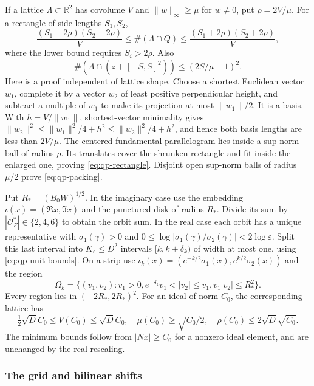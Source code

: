 If a lattice $\Lambda\subset\mathbb R^2$ has covolume $V$ and
$\|w\|_\infty\geq\mu$ for $w\ne0$, put $\rho=2V/\mu$.
For a rectangle of side lengths $S_1,S_2$,
\begin{equation}
 \frac{(S_1-2\rho)(S_2-2\rho)}V
 \leq\#(\Lambda\cap Q)
 \leq\frac{(S_1+2\rho)(S_2+2\rho)}V,
 \label{eq:qp-rectangle}
\end{equation}
where the lower bound requires $S_i>2\rho$.
Also
\begin{equation}
 \#(\Lambda\cap(z+[-S,S]^2))\leq(2S/\mu+1)^2.
 \label{eq:qp-packing}
\end{equation}
Here is a proof independent of lattice shape.  Choose a shortest
Euclidean vector $w_1$, complete it by a vector $w_2$ of least positive
perpendicular height, and subtract a multiple of $w_1$ to make its
projection at most $\|w_1\|/2$.  It is a basis.  With
$h=V/\|w_1\|$, shortest-vector minimality gives
$\|w_2\|^2\leq\|w_1\|^2/4+h^2\leq\|w_2\|^2/4+h^2$,
and hence both basis lengths are less than $2V/\mu$.
The centered fundamental parallelogram lies inside a sup-norm ball of
radius $\rho$.  Its translates cover the shrunken rectangle and fit
inside the enlarged one, proving \eqref{eq:qp-rectangle}.
Disjoint open sup-norm balls of radius $\mu/2$ prove
\eqref{eq:qp-packing}.

Put $R_*=(B_0W)^{1/2}$.  In the imaginary case use the embedding
$\iota(x)=(\Re x,\Im x)$ and the punctured disk of radius $R_*$.
Divide its sum by $|\mathcal O_F^*|\in\{2,4,6\}$ to obtain the orbit
sum.  In the real case each orbit has a unique representative with
$\sigma_1(\gamma)>0$ and
$0\leq\log|\sigma_1(\gamma)/\sigma_2(\gamma)|<2\log\varepsilon$.
Split this last interval into $K_\varepsilon\leq D^2$ intervals
$[k,k+\delta_k)$ of width at most one, using
\eqref{eq:qp-unit-bounds}.  On a strip use
$\iota_k(x)=(e^{-k/2}\sigma_1(x),e^{k/2}\sigma_2(x))$ and the region
\[
 \Omega_k=\{(v_1,v_2):v_1>0, e^{-\delta_k}v_1<|v_2|\leq v_1,
                                   v_1|v_2|\leq R_*^2\}.
\]
Every region lies in $(-2R_*,2R_*)^2$.  For an ideal of norm $C_0$,
the corresponding lattice has
\begin{equation}
 \tfrac12\sqrt D C_0\leq V(C_0)\leq\sqrt D C_0,
 \quad \mu(C_0)\geq\sqrt{C_0/2},
 \quad \rho(C_0)\leq2\sqrt D\sqrt{C_0}.
 \label{eq:qp-ideal-lattice}
\end{equation}
The minimum bounds follow from $|Nx|\geq C_0$ for a nonzero ideal
element, and are unchanged by the real rescaling.

\subsubsection{The grid and bilinear shifts}

